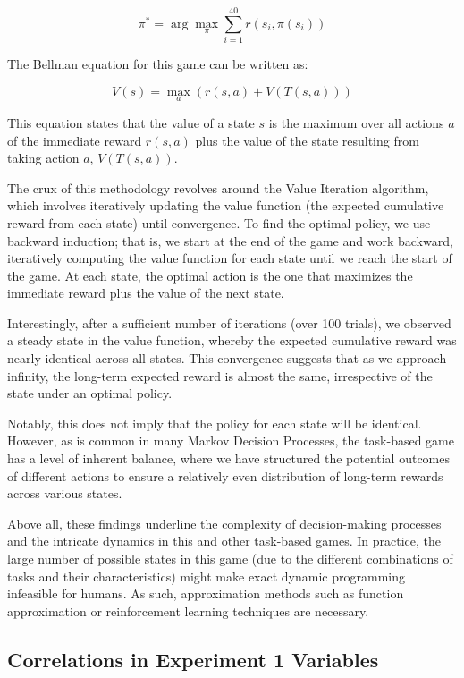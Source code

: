 \documentclass[
]{article}
\begin{document}
\[
 \pi^* = \arg\max_{\pi} \sum_{i=1}^{40} r(s_i, \pi(s_i))
\]

The Bellman equation for this game can be written as:

\[
V(s) = \max_{a} \left( r(s, a) + V(T(s, a)) \right)
\]

This equation states that the value of a state \(s\) is the maximum over
all actions \(a\) of the immediate reward \(r(s, a)\) plus the value of
the state resulting from taking action \(a\), \(V(T(s, a))\).

The crux of this methodology revolves around the Value Iteration
algorithm, which involves iteratively updating the value function (the
expected cumulative reward from each state) until convergence. To find
the optimal policy, we use backward induction; that is, we start at the
end of the game and work backward, iteratively computing the value
function for each state until we reach the start of the game. At each
state, the optimal action is the one that maximizes the immediate reward
plus the value of the next state.

Interestingly, after a sufficient number of iterations (over 100
trials), we observed a steady state in the value function, whereby the
expected cumulative reward was nearly identical across all states. This
convergence suggests that as we approach infinity, the long-term
expected reward is almost the same, irrespective of the state under an
optimal policy.

Notably, this does not imply that the policy for each state will be
identical. However, as is common in many Markov Decision Processes, the
task-based game has a level of inherent balance, where we have
structured the potential outcomes of different actions to ensure a
relatively even distribution of long-term rewards across various states.

Above all, these findings underline the complexity of decision-making
processes and the intricate dynamics in this and other task-based games.
In practice, the large number of possible states in this game (due to
the different combinations of tasks and their characteristics) might
make exact dynamic programming infeasible for humans. As such,
approximation methods such as function approximation or reinforcement
learning techniques are necessary.

\hypertarget{correlations-in-experiment-1-variables}{%
\subsection{Correlations in Experiment 1
Variables}\label{correlations-in-experiment-1-variables}}
\end{document}

